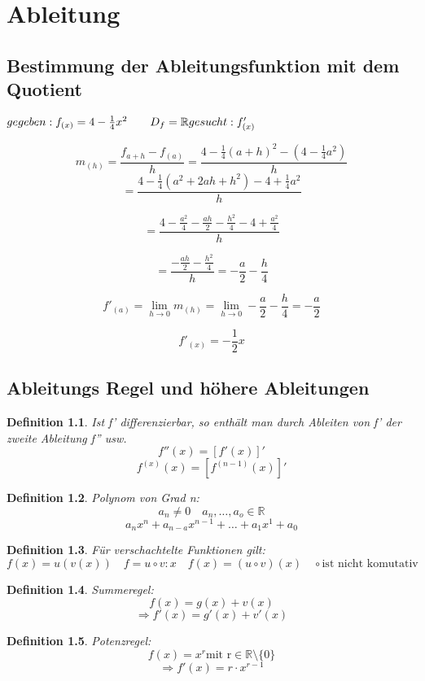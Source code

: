 \documentclass{scrbook}
\newtheorem{definition}{Definition}
\begin{document}
\chapter{Ableitung}

\section{Bestimmung der Ableitungsfunktion mit dem Quotient}
\(
gegeben: f_{(x)} = 4 - \frac 1 4 x^2 \qquad D_f = \mathbb{R}  \\
\newline
gesucht: f'_{(x)}
\)

\[m_{(h)} = \frac{f_{a+h}-f_{(a)}}h = \frac{4-\frac 1 4 (a+h)^2-(4-\frac 1 4 a^2)}h \]
\[= \frac{4-\frac 1 4 (a^2+2 a h + h^2) - 4 + \frac 1 4 a^2}h \]

\[= \frac{4-\frac {a^2} {4} - \frac {ah} {2} - \frac {h^2} {4} - 4 + \frac {a^2} 4}h \]

\[= \frac {-\frac {a h} {2} - \frac {h^2} 4}h = -\frac a 2 - \frac h 4\]

\[f'_{(a)} = \lim_{h\to0} m_{(h)} = \lim_{h\to0}-\frac a 2 -\frac h 4 = -\frac a 2\]

\[f'_{(x)} = -\frac 1 2 x \]

\section{Ableitungs Regel und höhere Ableitungen}
\begin{definition}
Ist f' differenzierbar, so enthält man durch Ableiten von f' der zweite Ableitung f'' usw.
\[f''(x) = [f'(x)]'\]
\[f^{(x)}(x) = [f^{(n-1)}(x)]'\]
\end{definition}

\begin{definition}
Polynom von Grad n:
\[ a_n \neq0\quad a_n, \dots, a_o \in \mathbb{R}\]
\[a_n x^n+a_{n-a}x^{n-1}+\dots+a_1 x^1+a_0\]
\end{definition}
\begin{definition}
Für verschachtelte Funktionen gilt:
\[f(x) = u(v(x)) \quad f = u\circ v:x\quad f(x) = (u \circ v)(x) \quad \circ \text{ist nicht komutativ}\]
\end{definition}

\begin{definition}Summeregel: 
\[f(x) = g(x) + v(x)\]
\[ \Rightarrow f'(x) = g'(x) + v'(x)\]
\end{definition}

\begin{definition}Potenzregel: 
\[f(x) = x^r \text{mit r} \in \mathbb{R} \text{\textbackslash} \{0\}\]
\[ \Rightarrow f'(x) = r \cdot x^{r-1}\]
\end{definition}
\end{document}
